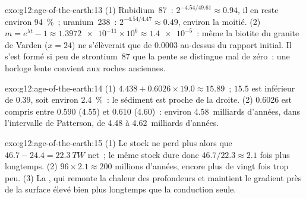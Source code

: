\begin{solution}{exo:g12:age-of-the-earth:13}
(1) Rubidium~87~: $2^{-4.54/49.61} \approx 0.94$, il en reste environ
\qty{94}{\percent}~; uranium~238~: $2^{-4.54/4.47} \approx 0.49$, environ
la moitié. (2) $m =
e^{\lambda t} - 1 \approx \num{1.3972e-11} \times 10^6 \approx
\num{1.4e-5}$~: même la biotite du granite de Varden ($x = 24$) ne
s'élèverait que de $0.0003$ au-dessus du rapport initial. Il s'est formé si
peu de strontium~87 que la pente se distingue mal de zéro~: une horloge
lente convient aux roches anciennes.
\end{solution}

\begin{solution}{exo:g12:age-of-the-earth:14}
(1) $4.438 + 0.6026 \times 19.0 \approx 15.89$~; $15.5$ est inférieur de $0.39$,
soit environ \qty{2.4}{\percent}~: le sédiment est proche de la droite.
(2) 0.6026 est compris entre 0.590 (4.55) et 0.610 (4.60)~: environ
4.58~milliards d'années, dans l'intervalle de Patterson, de 4.48 à
4.62~milliards d'années.
\end{solution}

\begin{solution}{exo:g12:age-of-the-earth:15}
(1) Le stock ne perd plus alors que $46.7 - 24.4 = \qty{22.3}{TW}$ net~; le
même stock dure donc $46.7/22.3 \approx 2.1$ fois plus longtemps. (2) $96 \times 2.1 \approx
200$ millions d'années, encore plus de vingt fois trop peu. (3) La
, qui remonte la chaleur des profondeurs et maintient
le gradient près de la surface élevé bien plus longtemps que la conduction
seule.
\end{solution}

